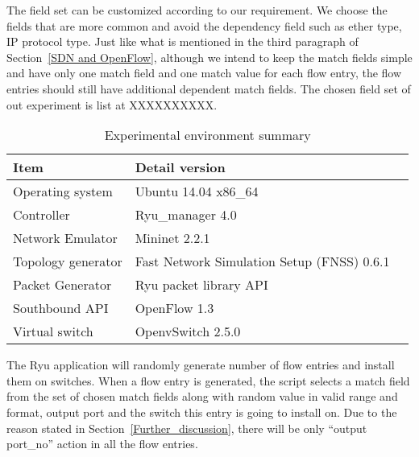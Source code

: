 The field set can be customized according to our requirement. We choose the fields that are more common and avoid the dependency field such as ether type, IP protocol type. Just like what is mentioned in the third paragraph of Section~\ref{SDN and OpenFlow}, although we intend to keep the match fields simple and have only one match field and one match value for each flow entry, the flow entries should still have additional dependent match fields. The chosen field set of out experiment is list at XXXXXXXXXX.


\begin{table}[H]
\centering
\caption{Experimental environment summary}
\begin{tabular}{|l|p{4cm}|p{4.5cm}}
\hline Item & Detail version \\
\hline Operating system & Ubuntu 14.04 x86\_64 \\
\hline Controller & Ryu\_manager 4.0 \\
\hline Network Emulator & Mininet 2.2.1 \\
\hline Topology generator & Fast Network Simulation Setup (FNSS) 0.6.1\\
\hline Packet Generator & Ryu packet library API \\
\hline Southbound API & OpenFlow 1.3 \\
\hline Virtual switch & OpenvSwitch 2.5.0 \\
\hline 
\end{tabular}
\label{table:Experiment_table}
\end{table}


The Ryu application will randomly generate number of flow entries and install them on switches. 
When a flow entry is generated, the script selects a match field from the set of chosen match fields along with random value in valid range and format, output port and the switch this entry is going to install on. Due to the reason stated in Section~\ref{Further_discussion}, there will be only ``output port\_no'' action in all the flow entries.

